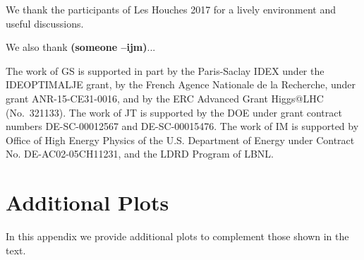 \documentclass[11pt,letterpaper]{article}
\newcommand{\ijm}[1]{\textbf{\textcolor{llblue}{(#1 --ijm)}}}
\begin{document}
\begin{acknowledgments}

We thank the participants of Les Houches 2017 for a lively environment and useful discussions.

We also thank \ijm{someone}...

The work of GS is supported in part by the Paris-Saclay IDEX under the
IDEOPTIMALJE grant, by the French Agence Nationale de la Recherche,
under grant ANR-15-CE31-0016, and by the ERC Advanced Grant Higgs@LHC
(No.\ 321133).
%
The work of JT is supported by the DOE under grant contract numbers DE-SC-00012567 and DE-SC-00015476.
%
The work of IM is supported by Office of High Energy Physics of the U.S. Department of Energy under Contract No. DE-AC02-05CH11231, and the LDRD Program of LBNL.


\end{acknowledgments}



\appendix

\section{Additional Plots}\label{app:more_plot}

In this appendix we provide additional plots to complement those shown in the text.

%
%
%
%
%
%

%
%
%
%
%
%
%
%
%
\end{document}
